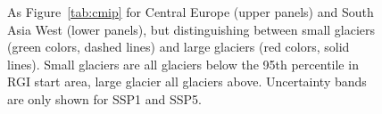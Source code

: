 \begin{figure}[htp]
          \vspace*{0.5cm}

          \caption{As Figure~\ref{tab:cmip} for Central Europe (upper panels) and South Asia West (lower panels), but distinguishing between small glaciers (green colors, dashed lines) and large glaciers (red colors, solid lines). Small glaciers are all glaciers below the 95th percentile in RGI start area, large glacier all glaciers above. Uncertainty bands are only shown for SSP1 and SSP5.}
          \label{fig:cmip_area_classes}
      \end{figure}

    
  
